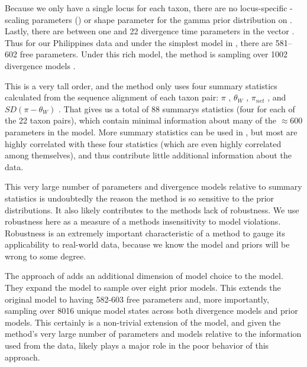 \documentclass[letterpaper,12pt]{article}
\begin{document}
\begin{linenumbers}
Because we only have a single locus for each taxon, there are no locus-specific
\myTheta{}-scaling parameters (\locusMutationRateScalar{}) or
\locusRateHetShapeParameter shape parameter for the gamma prior distribution on
\locusMutationRateScalar{}.
Lastly, there are between one and 22 divergence time parameters \divt{} in
the vector \divtvector.
Thus for our Philippines data and under the simplest model in \msb, there are
581--602 free parameters.
Under this rich model, the method is sampling over 1002 divergence models
\citep[i.e., the number of integer partitions of $Y=22$][]{Oaks2012}.

This is a very tall order, and the method only uses four summary statistics
calculated from the sequence alignment of each taxon pair:
$\pi$ \citep{Tajima1983}, $\theta_W$
\citep{Watterson1975}, $\pi_{net}$ \citep{Takahata1985}, and
$SD(\pi-\theta_W)$ \citep{Tajima1989}.
That gives us a total of 88 summarys statistics (four for each of the 22 taxon
pairs), which contain minimal information about many of the $\approx 600$
parameters in the model.
More summary statistics can be used in \msb, but most are highly correlated
with these four statistics (which are even highly correlated among themselves),
and thus contribute little additional information about the data.

This very large number of parameters and divergence models relative to 
summary statistics is undoubtedly the reason the method is so sensitive
to the prior distributions.
It also likely contributes to the methods lack of robustness.
We use robustness here as a measure of a methods insensitivity to model
violations.
Robustness is an extremely important characteristic of a method to gauge its
applicability to real-world data, because we know the model and priors will be
wrong to some degree.

The approach of \citet{Hickerson2013} adds an additional dimension of model
choice to the model. They expand the model to sample over eight prior models.
This extends the original model to having 582-603 free parameters and, more
importantly, sampling over 8016 unique model states across both divergence
models and prior models.
This certainly is a non-trivial extension of the model, and given the method's
very large number of parameters and models relative to the information used
from the data, likely plays a major role in the poor behavior of this approach.


\end{linenumbers}
\end{document}
